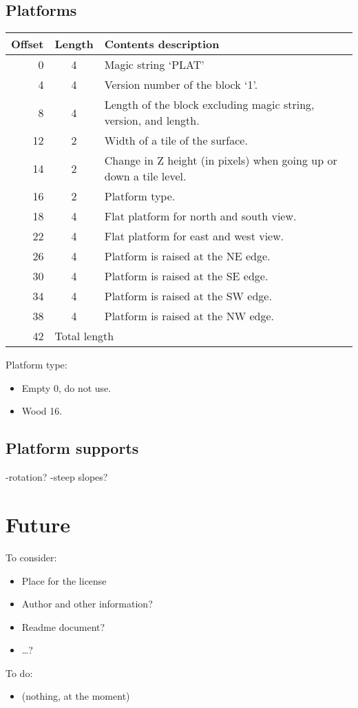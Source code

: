 \documentclass{article}
\begin{document}
\subsection{Platforms}
\begin{center}
\begin{tabular}{|r|c|l|} \hline
\textbf{Offset} & \textbf{Length} & \textbf{Contents description} \\ \hline
   0 &  4 & Magic string `PLAT' \\
   4 &  4 & Version number of the block `1'. \\
   8 &  4 & Length of the block excluding magic string, version, and length. \\
  12 &  2 & Width of a tile of the surface. \\
  14 &  2 & Change in Z height (in pixels) when going up or down a tile level. \\
  16 &  2 & Platform type. \\
  18 &  4 & Flat platform for north and south view. \\
  22 &  4 & Flat platform for east and west view. \\
  26 &  4 & Platform is raised at the NE edge. \\
  30 &  4 & Platform is raised at the SE edge. \\
  34 &  4 & Platform is raised at the SW edge. \\
  38 &  4 & Platform is raised at the NW edge. \\ \hline
  42 & \multicolumn{2}{l|}{Total length} \\ \hline
\end{tabular}
\end{center}

Platform type:
\begin{itemize}
\item Empty 0, do not use.
\item Wood 16.
\end{itemize}


\subsection{Platform supports}
-rotation?
-steep slopes?

\newpage
\section{Future}

To consider:
\begin{itemize}
\item Place for the license
\item Author and other information?
\item Readme document?
\item \ldots?
\end{itemize}

To do:
\begin{itemize}
\item (nothing, at the moment)
\end{itemize}
\end{document}
